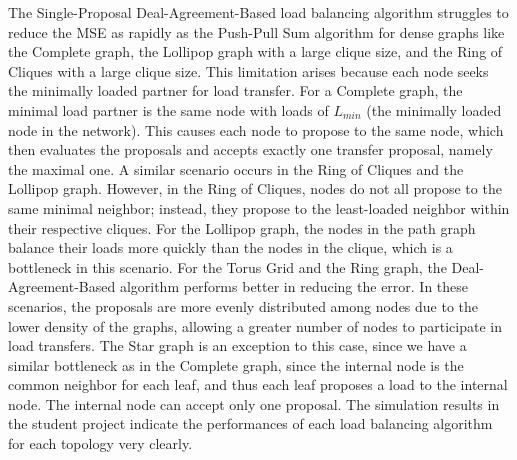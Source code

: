 The Single-Proposal Deal-Agreement-Based load balancing algorithm struggles to reduce the MSE as rapidly as the Push-Pull Sum algorithm for dense graphs like the Complete graph, the Lollipop graph with a large clique size, and the Ring of Cliques with a large clique size. This limitation arises because each node seeks the minimally loaded partner for load transfer. For a Complete graph, the minimal load partner is the same node with loads of $L_{min}$ (the minimally loaded node in the network). This causes each node to propose to the same node, which then evaluates the proposals and accepts exactly one transfer proposal, namely the maximal one. A similar scenario occurs in the Ring of Cliques and the Lollipop graph. However, in the Ring of Cliques, nodes do not all propose to the same minimal neighbor; instead, they propose to the least-loaded neighbor within their respective cliques. For the Lollipop graph, the nodes in the path graph balance their loads more quickly than the nodes in the clique, which is a bottleneck in this scenario. For the Torus Grid and the Ring graph, the Deal-Agreement-Based algorithm performs better in reducing the error. In these scenarios, the proposals are more evenly distributed among nodes due to the lower density of the graphs, allowing a greater number of nodes to participate in load transfers. The Star graph is an exception to this case, since we have a similar bottleneck as in the Complete graph, since the internal node is the common neighbor for each leaf, and thus each leaf proposes a load to the internal node. The internal node can accept only one proposal. The simulation results in the student project \cite{Bayazitoglu} indicate the performances of each load balancing algorithm for each topology very clearly.
